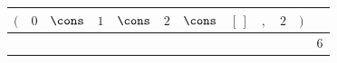 {\scriptsize\setlength{\tabcolsep}{1.5pt}%
\begin{tabular}{ccccccccccc|l}
$($ & $\text{0}$ & $\cons$ & $\text{1}$ & $\cons$ & $\text{2}$ & $\cons$ & $[\,]$ & $,$ & $\text{2}$ & $)$ & \\ \hline
\gcell{$$} & \gcell{$\posD{\bullet}$} & \gcell{$\posC{\circ}$} & \gcell{$\posD{\bullet}$} & \gcell{$\posC{\circ}$} & \gcell{$\posD{\bullet}$} & \gcell{$\posC{\circ}$} & \gcell{$\posC{\circ}$} & \gcell{$\posC{\circ}$} & \gcell{$\posD{\bullet}$} & \gcell{$$} & $\text{6}$ \\
\end{tabular}}
